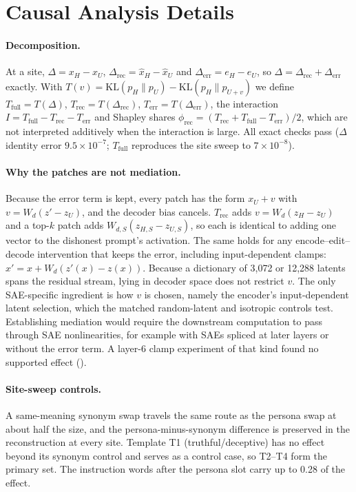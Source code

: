 \section{Causal Analysis Details}\label{app:causal}

\paragraph{Decomposition.} At a site, $\Delta=x_H-x_U$, $\Delta_{\text{rec}}=\hat{x}_H-\hat{x}_U$ and
$\Delta_{\text{err}}=e_H-e_U$, so $\Delta=\Delta_{\text{rec}}+\Delta_{\text{err}}$ exactly. With
$T(v)=\mathrm{KL}(p_H\|p_U)-\mathrm{KL}(p_H\|p_{U+v})$ we define $T_{\text{full}}=T(\Delta)$,
$T_{\text{rec}}=T(\Delta_{\text{rec}})$, $T_{\text{err}}=T(\Delta_{\text{err}})$, the interaction
$I=T_{\text{full}}-T_{\text{rec}}-T_{\text{err}}$ and Shapley shares $\phi_{\text{rec}}=(T_{\text{rec}}+T_{\text{full}}-T_{\text{err}})/2$,
which are not interpreted additively when the interaction is large. All exact checks pass ($\Delta$ identity error
$9.5\times10^{-7}$; $T_{\text{full}}$ reproduces the site sweep to $7\times10^{-8}$).

\paragraph{Why the patches are not mediation.} Because the error term is kept, every patch has the form $x_U+v$ with
$v=W_d(z'-z_U)$, and the decoder bias cancels. $T_{\text{rec}}$ adds $v=W_d(z_H-z_U)$ and a top-$k$ patch adds
$W_{d,S}(z_{H,S}-z_{U,S})$, so each is identical to adding one vector to the dishonest prompt's activation. The same holds
for any encode--edit--decode intervention that keeps the error, including input-dependent clamps:
$x'=x+W_d(z'(x)-z(x))$. Because a dictionary of 3{,}072 or 12{,}288 latents spans the residual stream, lying in decoder
space does not restrict $v$. The only SAE-specific ingredient is how $v$ is chosen, namely the encoder's input-dependent
latent selection, which the matched random-latent and isotropic controls test. Establishing mediation would require the
downstream computation to pass through SAE nonlinearities, for example with SAEs spliced at later layers or without the
error term. A layer-6 clamp experiment of that kind found no supported effect ().

\paragraph{Site-sweep controls.} A same-meaning synonym swap travels the same route as the persona swap at about half
the size, and the persona-minus-synonym difference is preserved in the reconstruction at every site. Template T1
(truthful/deceptive) has no effect beyond its synonym control and serves as a control case, so T2--T4 form the primary
set. The instruction words after the persona slot carry up to 0.28 of the effect.

